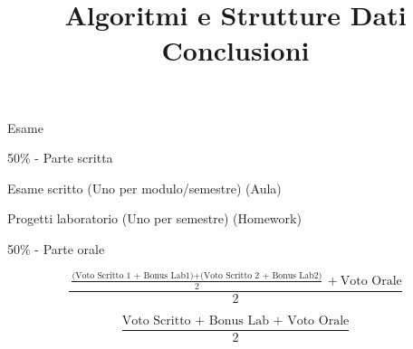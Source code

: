 

\usepackage{epigraph}
\usepackage{listings}
\usepackage{colortbl}


\newcommand{\Sum}{\mathit{sum}}
\newcommand{\MaxSoFar}{\mathit{maxSoFar}}
\newcommand{\MaxEndingHere}{\mathit{maxEndingHere}}

\newcommand*{\RC}[1]{\hfill\makebox[3.0cm][l]{#1}}%


\title[ASD - Introduzione]{\textbf{Algoritmi e Strutture Dati}\\[24pt]Conclusioni}

\graphicspath{{figs/00/}}



\FrameTitle{}

\begin{frame}{Esame}

\vspace{-9pt}
\begin{myboxtitle}
\BIL
\item \alert{50\% - Parte scritta}
\BI
\item Esame scritto (Uno per modulo/semestre) (Aula)
\item Progetti laboratorio (Uno per semestre) (Homework) 
\EI
\item \alert{50\% - Parte orale}
\EIL
\end{myboxtitle}

\begin{myboxtitle}
\[
\frac{\frac{\textrm{(Voto Scritto 1 + Bonus Lab1)} + \textrm{(Voto Scritto 2 + Bonus Lab2)}}{2} + \textrm{Voto Orale}}{2}
\]
\end{myboxtitle}

\begin{myboxtitle}
\[
\frac{\textrm{Voto Scritto + Bonus Lab + Voto Orale}}{2}
\]
\end{myboxtitle}

\end{frame}

